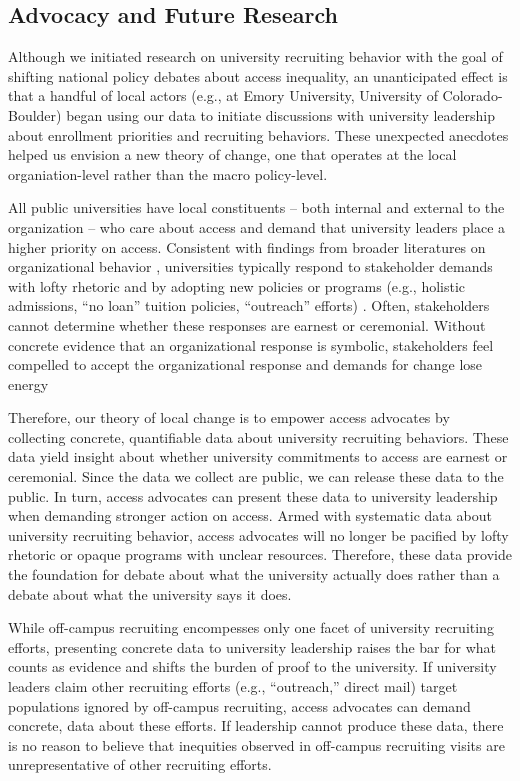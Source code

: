 \documentclass[twoside]{article}
\begin{document}
\subsection*{Advocacy and Future Research}

Although we initiated research on university recruiting behavior with the goal of shifting national policy debates about access inequality, an unanticipated effect is that a handful of local actors (e.g., at Emory University, University of Colorado-Boulder) began using our data to initiate discussions with university leadership about enrollment priorities and recruiting behaviors.  These unexpected anecdotes helped us envision a new theory of change, one that operates at the local organiation-level rather than the macro policy-level.

All public universities have local constituents -- both internal and external to the organization -- who care about access and demand that university leaders place a higher priority on access.  Consistent with findings from broader literatures on organizational behavior \citep{RN2436}, universities typically respond to stakeholder demands with lofty rhetoric and by adopting new policies or programs (e.g., holistic admissions, ``no loan'' tuition policies, ``outreach'' efforts) \citep[e.g., ][]{RN4017}.  Often, stakeholders cannot determine whether these responses are earnest or ceremonial. Without concrete evidence that an organizational response is symbolic, stakeholders feel compelled to accept the organizational response and demands for change lose energy

Therefore, our theory of local change is to empower access advocates by collecting concrete, quantifiable data about university recruiting behaviors. These data yield insight about whether university commitments to access are earnest or ceremonial.  Since the data we collect are public, we can release these data to the public. In turn, access advocates can present these data to university leadership when demanding stronger action on access.  Armed with systematic data about university recruiting behavior, access advocates will no longer be pacified by lofty rhetoric or opaque programs with unclear resources.  Therefore, these data provide the foundation for debate about what the university actually does rather than a debate about what the university says it does.

While off-campus recruiting encompesses only one facet of university recruiting efforts, presenting concrete data to university leadership raises the bar for what counts as evidence and shifts the burden of proof to the university. If university leaders claim other recruiting efforts (e.g., ``outreach,''  direct mail) target populations ignored by off-campus recruiting, access advocates can demand concrete, data about these efforts. If leadership cannot produce these data, there is no reason to believe that inequities observed in off-campus recruiting visits are unrepresentative of other recruiting efforts.
\end{document}
